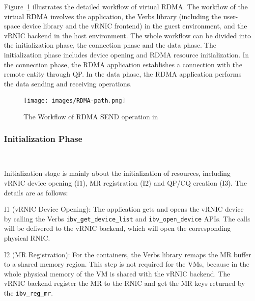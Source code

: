 Figure~\ref{fig:rdma-path} illustrates the detailed workflow of virtual RDMA. The workflow of the virtual RDMA involves the application, the Verbs library (including the user-space device library and the vRNIC frontend) in the guest environment, and the vRNIC backend in the host environment.
The whole workflow can be divided into the initialization phase, the connection phase and the data phase. The initialization phase includes device opening and RDMA resource initialization.
In the connection phase, the RDMA application establishes a connection with the remote entity through QP.
In the data phase, the RDMA application performs the data sending and receiving operations.

\begin{figure}[!ht]
	\centering
	\texttt{[image: images/RDMA-path.png]}
	\caption{The Workflow of RDMA SEND operation in \sys}
	\label{fig:rdma-path}
\end{figure}

\subsubsection{\textbf{Initialization Phase}}
\
\noindent

Initialization stage is mainly about the initialization of resources, including vRNIC device opening (I1), MR registration (I2) and QP/CQ creation (I3). The details are as follows:


I1 (vRNIC Device Opening): The application gets and opens the vRNIC device by calling the Verbs \texttt{ibv\_get\_device\_list} and \texttt{ibv\_open\_device} APIs. The calls will be delivered to the vRNIC backend, which will open the corresponding physical RNIC.


I2 (MR Registration): For the containers, the Verbs library remaps the MR buffer to a shared memory region. This step is not required for the VMs, because in \sys the whole physical memory of the VM is shared with the vRNIC backend. The vRNIC backend register the MR to the RNIC and get the MR keys returned by the \texttt{ibv\_reg\_mr}.

